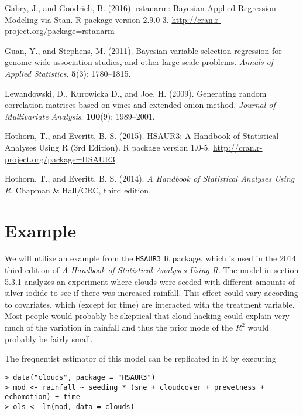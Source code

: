 \documentclass[11pt]{article}
\begin{document}
\noindent

\bibitem Gabry, J., and Goodrich, B. (2016). rstanarm: Bayesian Applied
Regression Modeling via Stan. R package version 2.9.0-3.
\url{http://cran.r-project.org/package=rstanarm}

\bibitem Guan, Y., and Stephens, M. (2011). Bayesian variable selection
regression for genome-wide association studies, and other large-scale problems.
\emph{Annals of Applied Statistics}. {\bf 5}(3): 1780--1815.

\bibitem Lewandowski, D., Kurowicka D., and Joe, H. (2009). Generating random
correlation matrices based on vines and extended onion method.
\emph{Journal of Multivariate Analysis}. {\bf 100}(9): 1989--2001.

\bibitem Hothorn, T., and Everitt, B. S. (2015).  HSAUR3: A Handbook of
Statistical Analyses Using R (3rd Edition). R package version 1.0-5.
\url{http://cran.r-project.org/package=HSAUR3}

\bibitem Hothorn, T., and Everitt, B. S. (2014). \emph{A Handbook of
Statistical Analyses Using R}. Chapman \& Hall/CRC, third edition.


\appendix
\clearpage
\section{Example}


We will utilize an example from the {\tt HSAUR3} R package, which is used in the
2014 third edition of \emph{A Handbook of Statistical Analyses Using R}.
The model in section 5.3.1 analyzes an experiment where clouds were seeded
with different amounts of silver iodide to see if there was increased rainfall.
This effect could vary according to covariates, which (except for time) are
interacted with the treatment variable. Most people would probably be skeptical
that cloud hacking could explain very much of the variation in rainfall and
thus the prior mode of the $R^2$ would probably be fairly small.

The frequentist estimator of this model can be replicated in R by executing

\begin{lstlisting}
> data("clouds", package = "HSAUR3")
> mod <- rainfall ~ seeding * (sne + cloudcover + prewetness + echomotion) + time
> ols <- lm(mod, data = clouds)
\end{lstlisting}
\end{document}
